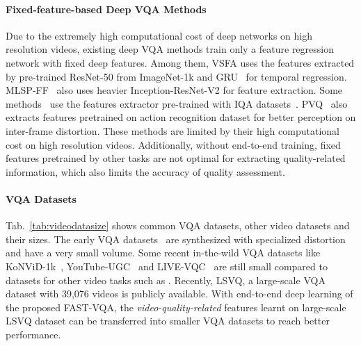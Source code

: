 \documentclass[runningheads]{llncs}
\begin{document}
\paragraph{Fixed-feature-based Deep VQA Methods} Due to the extremely high computational cost of deep networks on high resolution videos, existing deep VQA methods train only a feature regression network with fixed deep features. Among them, VSFA \cite{vsfa} uses the features extracted by pre-trained ResNet-50 \cite{he2016residual} from ImageNet-1k \cite{imagenet} and GRU~\cite{gru} for temporal regression. MLSP-FF~\cite{mlsp} also uses heavier Inception-ResNet-V2 \cite{irnv2} for feature extraction. Some methods~\cite{pvq,lsctphiq} use the features extractor pre-trained with IQA datasets~\cite{koniq,paq2piq}. PVQ~\cite{pvq} also extracts features pretrained on action recognition dataset \cite{k400data} for better perception on inter-frame distortion. These methods are limited by their high computational cost on high resolution videos. Additionally, without end-to-end training, fixed features pretrained by other tasks are not optimal for extracting quality-related information, which also limits the accuracy of quality assessment.

\paragraph{VQA Datasets} 

Tab.~\ref{tab:videodatasize} shows common VQA datasets, other video datasets and their sizes. The early VQA datasets~\cite{cvd,qualcomm} are synthesized with specialized distortion and have a very small volume. Some recent in-the-wild VQA datasets like KoNViD-1k~\cite{kv1k}, YouTube-UGC~\cite{ytugc} and LIVE-VQC~\cite{vqc} are still small compared to datasets for other video tasks such as \cite{k400data,activitynet,ava}.
Recently, LSVQ\cite{pvq}, a large-scale VQA dataset with 39,076 videos is publicly available. With end-to-end deep learning of the proposed FAST-VQA, the \textit{video-quality-related} features learnt on large-scale LSVQ dataset can be transferred into smaller VQA datasets to reach better performance.
\end{document}
